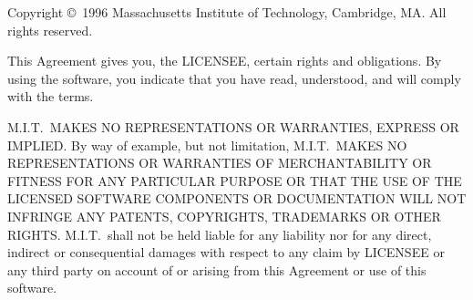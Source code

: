 \mbox{}
\vfill
\noindent Copyright \copyright\ 1996 Massachusetts Institute of Technology,
Cambridge, MA.  All rights reserved.

\vspace{\baselineskip}
\noindent This Agreement gives you, the LICENSEE, certain rights 
and obligations.
By using the software, you indicate that you have read, understood, and
will comply with the terms.

%
%

\vspace{\baselineskip}
\noindent M.I.T.\ MAKES NO REPRESENTATIONS OR WARRANTIES, 
EXPRESS OR IMPLIED.  By
way of example, but not limitation, M.I.T.\ MAKES NO REPRESENTATIONS OR
WARRANTIES OF MERCHANTABILITY OR FITNESS FOR ANY PARTICULAR PURPOSE OR
THAT THE USE OF THE LICENSED SOFTWARE COMPONENTS OR DOCUMENTATION WILL
NOT INFRINGE ANY PATENTS, COPYRIGHTS, TRADEMARKS OR OTHER RIGHTS.
M.I.T.\ shall not be held liable for any liability nor for any direct,
indirect or consequential damages with respect to any claim by LICENSEE
or any third party on account of or arising from this Agreement or use
of this software.

